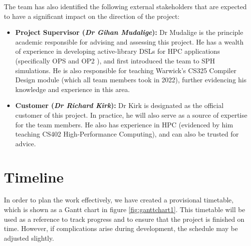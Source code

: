 The team has also identified the following external stakeholders that are expected to have a significant impact on the direction of the project:
\begin{itemize}
    \item \textbf{Project Supervisor (\textit{Dr Gihan Mudalige}):} Dr Mudalige is the principle academic responsible for advising and assessing this project. He has a wealth of experience in developing active-library DSLs for HPC applications 
    (specifically OPS \cite{reguly2014ops} and OP2 \cite{mudalige2012op2}), and first introduced the team to SPH simulations. He is also responsible for teaching Warwick's CS325 Compiler Design module (which all team members took in 2022), further evidencing his knowledge and experience in this area.  

    \item \textbf{Customer (\textit{Dr Richard Kirk}):} Dr Kirk is designated as the official customer of this project. In practice, he will also serve as a source of expertise for the team members. He also has experience in HPC (evidenced by him teaching CS402 High-Performance Computing), and can also be trusted for advice. 
\end{itemize}

\section{Timeline}

In order to plan the work effectively, we have created a provisional timetable, which is shown as a Gantt chart in figure \ref{fig:ganttchart1}. This timetable will be used as a reference to track progress and to ensure that the project is finished on time. However, if complications arise during development, the schedule may be adjusted slightly.

